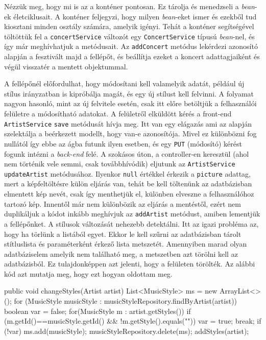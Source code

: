 Nézzük meg, hogy mi is az a konténer pontosan. Ez tárolja és menedzseli a \textit{bean}-ek életciklusait. A konténer feljegyzi, hogy milyen \textit{bean}-eket ismer és ezekből tud kiosztani minden osztály számára, amelyik igényi. Tehát a konténer segítségével töltöttük fel a \texttt{concertService} változót egy \texttt{ConcertService} típusú \textit{bean}-nel, és így már meghívhatjuk a metódusait. Az \texttt{addConcert} metódus lekérdezi azonosító alapján a fesztivált majd a fellépőt, és beállítja ezeket a koncert adattagjaiként és végül visszatér a mentett objektummal.


A fellépőnél előfordulhat, hogy módosítani kell valamelyik adatát, például új stílus irányzatban is kipróbálja magát, és egy új stílust kell felvinni. A folyamat nagyon hasonló, mint az új felvitele esetén, csak itt előre betöltjük a felhasználói felületre a módosítható adatokat. A felületről elküldött kérés a front-end \texttt{ArtistService} \texttt{save} metódusát hívja meg. Itt van egy elágazás ami az alapján szelektálja a beérkezett modellt, hogy van-e azonosítója. Mivel ez különbözni fog nullától így ebbe az ágba futunk ilyen esetben, és egy \texttt{PUT} (módosító) kérést fogunk intézni a \textit{back-end} felé. A szokásos úton, a controller-en keresztül (ahol nem történik vele semmi, csak továbbhívódik) eljutunk az \texttt{ArtistService} \texttt{updateArtist} metódusához. Ilyenkor \texttt{null} értékkel érkezik a \texttt{picture} adattag, mert a képfeltöltésre külön eljárás van, tehát be kell töltenünk az adatbázisban elmentett kép nevét, csak így menthetjük el, különben elveszne a felhasználóhoz tartozó kép. Innentől már nem különbözik az eljárás a mentéstől, ezért nem duplikáljuk a kódot inkább meghívjuk az \texttt{addArtist} metódust, amiben lementjük a fellépőnket. A stílusok változását nehezebb detektálni. Itt az igazi probléma az, hogy ha törlünk a listából egyet. Ekkor le kell szűrni az adatbázisban tárolt stítluslista és paraméterként érkező lista metszetét. Amennyiben marad olyan adatbáziselem amelyik nem található meg, a metszetben azt törölni kell az adatbázisból. Ez tulajdonképpen azt jelenti, hogy a felületen törölték. Az alábbi kód azt mutatja meg, hogy ezt hogyan oldottam meg.
\begin{java}
public void changeStyles(Artist artist) {
	List<MusicStyle> ms = new ArrayList<>();
	for (MusicStyle musicStyle :
		musicStyleRepository.findByArtist(artist)) {
		boolean var = false;
		for(MusicStyle m : artist.getStyles()){
			if (m.getId()==musicStyle.getId() && 
				!m.getStyle().equals("")){
				var = true;
				break;
			}
		}
		if (!var){
			ms.add(musicStyle);
		}
	}
	musicStyleRepository.delete(ms);
	addStyles(artist);
}
\end{java}
